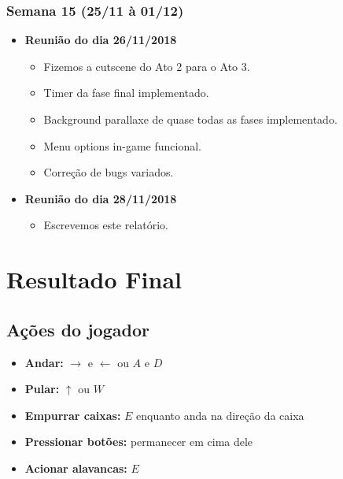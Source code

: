 \documentclass[a4paper, 11pt]{article}
\begin{document}
\subsubsection{Semana 15 (25/11 à 01/12)}
	\begin{itemize} 
		\item \textbf{Reunião do dia 26/11/2018}

		\begin{itemize}

    		\item Fizemos a cutscene do Ato 2 para o Ato 3.
    		\item Timer da fase final implementado.
    		\item Background parallaxe de quase todas as fases implementado.
    		\item Menu options in-game funcional.
    		\item Correção de bugs variados.

   		\end{itemize}

		\item \textbf{Reunião do dia 28/11/2018}

		\begin{itemize}

    		\item Escrevemos este relatório.

		\end{itemize}

	\end{itemize}


\section{Resultado Final} 
 
	\subsection{Ações do jogador} 
		\begin{itemize} 
			\item \textbf{Andar:} $\rightarrow$ e $\leftarrow$ ou $A$ e $D$  
			\item \textbf{Pular:} $\uparrow$ ou $W$
			\item \textbf{Empurrar caixas:} $E$ enquanto anda na direção da caixa  
			\item \textbf{Pressionar botões:} permanecer em cima dele 
			\item \textbf{Acionar alavancas:} $E$
		\end{itemize} 
 
\end{document}

